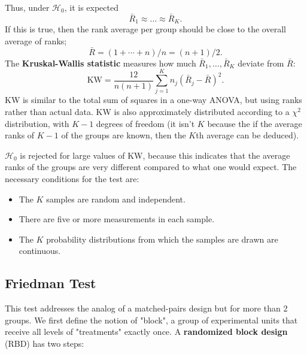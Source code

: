 \documentclass[12pt]{article}
\begin{document}
Thus, under $\mathcal{H}_0$, it is expected \[\bar{R}_1 \approx \dots \approx \bar{R}_K.\] If this is true, then the rank average per group should be close to the overall average of ranks; \[\bar{R} = (1 + \cdots + n)/n = (n+1)/2.\] The \textbf{Kruskal-Wallis statistic} measures how much $\bar{R}_1, \dots, \bar{R}_K$ deviate from $\bar{R}$: \[\text{KW} = \frac{12}{n(n+1)} \sum_{j=1}^K n_j (\bar{R}_j - \bar{R})^2.\] KW is similar to the total sum of squares in a one-way ANOVA, but using ranks rather than actual data. KW is also approximately distributed according to a $\chi^2$ distribution, with $K -1$ degrees of freedom (it isn't $K$ because the if the average ranks of $K-1$ of the groups are known, then the $K$th average can be deduced).

$\mathcal{H}_0$ is rejected for large values of KW, because this indicates that the average ranks of the groups are very different compared to what one would expect. The necessary conditions for the test are: \begin{itemize}
    \item The $K$ samples are random and independent.
    \item There are five or more measurements in each sample.
    \item The $K$ probability distributions from which the samples are drawn are continuous.
\end{itemize}

\subsection{Friedman Test}
This test addresses the analog of a matched-pairs design but for more than 2 groups. We first define the notion of "block", a group of experimental units that receive all levels of "treatments" exactly once. A \textbf{randomized block design} (RBD) has two steps:
\end{document}
